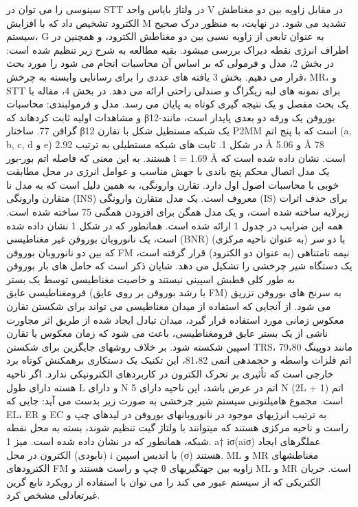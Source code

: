 سینوسی را می توان در STT در ولتاژ بایاس واحد V در مقابل زاویه بین دو مغناطش الکترود تشخیص داد که با افزایش M تشدید می شود. در نهایت، به منظور درک صحیح سیستم، G به عنوان تابعی از زاویه نسبی بین دو مغناطش الکترود، و همچنین در اطراف انرژی نقطه دیراک بررسی میشود. بقیه مطالعه به شرح زیر تنظیم شده است: در بخش 2، مدل و فرمولی که بر اساس آن محاسبات انجام می شود را مورد بحث قرار می دهیم. بخش 3 یافته های عددی را برای رسانایی وابسته به چرخش، MR، و STT برای نمونه های لبه زیگزاگ و صندلی راحتی ارائه می دهد. در بخش 4، مقاله با یک بحث مفصل و یک نتیجه گیری کوتاه به پایان می رسد.
مدل و فرمولبندی: محاسبات و مشاهدات اولیه ثابت کردهاند که β12-بوروفن یک ورقه دو بعدی پایدار است، مانند گرافن 77. ساختار β12 یک شبکه مستطیل شکل با تقارن P2MM است که با پنج اتم (a, b, c, d و e) در شکل 1. ثابت های شبکه مستطیلی به ترتیب 2.92 Å و 5.06 Å 78 هستند.
به این معنی که فاصله اتم بور-بور l = 1.69 Å است. نشان داده شده است که یک مدل اتصال محکم پنج باندی با جهش مناسب و عوامل انرژی در محل مطابقت خوبی با محاسبات اصول اول دارد. تقارن وارونگی، به همین دلیل است که به مدل نا متقارن وارونگی (INS) معروف است. یک مدل متقارن وارونگی (IS) برای حذف اثرات زیرلایه ساخته شده است، و یک مدل همگن برای افزودن همگنی 75 ساخته شده است. همه این ضرایب در جدول 1 ارائه شده است.
همانطور که در شکل 1 نشان داده شده است، یک نانوروبان بوروفن غیر مغناطیسی (BNR) با دو سر (به عنوان ناحیه مرکزی) که بین دو نانوروبان بوروفن FM نیمه نامتناهی (به عنوان دو الکترود) قرار گرفته است، یک دستگاه شیر چرخشی را تشکیل می دهد. شایان ذکر است که حامل های بار بوروفن به طور کلی قطبش اسپینی نیستند و خاصیت مغناطیسی توسط یک بستر فرومغناطیسی عایق (با رشد بوروفن بر روی عایق FM) به سرنخ های بوروفن تزریق می شود. از آنجایی که استفاده از میدان مغناطیسی می تواند برای شکستن تقارن معکوس زمانی مورد استفاده قرار گیرد، میدان تبادل ایجاد شده از طریق اثر مجاورت ناشی از یک بستر عایق فرومغناطیسی، باعث می شود که زمان معکوس یا تقارن اسپین شکسته شود. بر خلاف روشهای جایگزین برای شکستن TRS، مانند دوپینگ 79،80 اتم فلزات واسطه و حجمدهی اتمی 81،82، این تکنیک یک دستکاری برهمکنش کوتاه برد خارجی است که تأثیری بر تحرک الکترون در کاربردهای الکترونیکی ندارد. اگر ناحیه هسته دارای طول L و دارای N اتم در عرض باشد، این ناحیه دارای 5 N (2L + 1) اتم است. مجموع هامیلتونی سیستم شیر چرخشی به صورت زیر بدست می آید:
جایی که EL، ER و EC به ترتیب انرژیهای موجود در نانوروبانهای بوروفن در لیدهای چپ و راست و ناحیه مرکزی هستند که میتوانند با ولتاژ گیت تنظیم شوند، بسته به محل نقطه شبکه، همانطور که در نشان داده شده است. میز 1. a† iσ(aiσ) عملگرهای ایجاد (نابودی) الکترون در محل i با اندیس اسپین (σ) هستند. ML و MR مغناطشهای الکترودهای FM چپ و راست هستند و θ زاویه بین جهتگیریهای ML و MR است. جریان الکتریکی که از سیستم عبور می کند را می توان با استفاده از رویکرد تابع گرین غیرتعادلی مشخص کرد.
